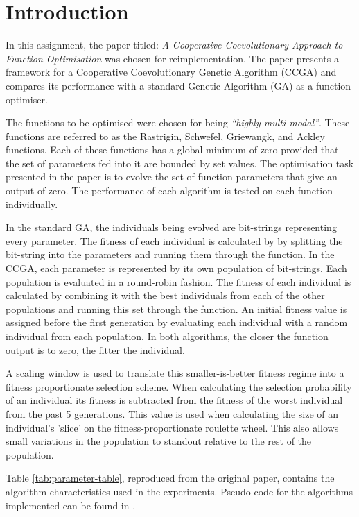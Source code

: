 \section{Introduction} \label{sec:introduction}

In this assignment, the paper titled: \textit{A Cooperative Coevolutionary Approach to Function Optimisation}\cite{original-paper} was chosen for reimplementation.
The paper presents a framework for a Cooperative Coevolutionary Genetic Algorithm (CCGA) and compares its performance with a standard Genetic Algorithm (GA) as a function optimiser.

The functions to be optimised were chosen for being \textit{``highly multi-modal''}.
These functions are referred to as the Rastrigin, Schwefel, Griewangk, and Ackley functions\cite{functions-1,functions-2,functions-3}.
Each of these functions has a global minimum of zero provided that the set of parameters fed into it are bounded by set values.
The optimisation task presented in the paper is to evolve the set of function parameters that give an output of zero.
The performance of each algorithm is tested on each function individually.

In the standard GA, the individuals being evolved are bit-strings representing every parameter.
The fitness of each individual is calculated by by splitting the bit-string into the parameters and running them through the function.
In the CCGA, each parameter is represented by its own population of bit-strings.
Each population is evaluated in a round-robin fashion.
The fitness of each individual is calculated by combining it with the best individuals from each of the other populations and running this set through the function.
An initial fitness value is assigned before the first generation by evaluating each individual with a random individual from each population.
In both algorithms, the closer the function output is to zero, the fitter the individual.

A scaling window is used to translate this smaller-is-better fitness regime into a fitness proportionate selection scheme.
When calculating the selection probability of an individual its fitness is subtracted from the fitness of the worst individual from the past 5 generations.
This value is used when calculating the size of an individual's 'slice' on the fitness-proportionate roulette wheel.
This also allows small variations in the population to standout relative to the rest of the population.

Table \ref{tab:parameter-table}, reproduced from the original paper, contains the algorithm characteristics used in the experiments.
Pseudo code for the algorithms implemented can be found in \cite{original-paper}.


